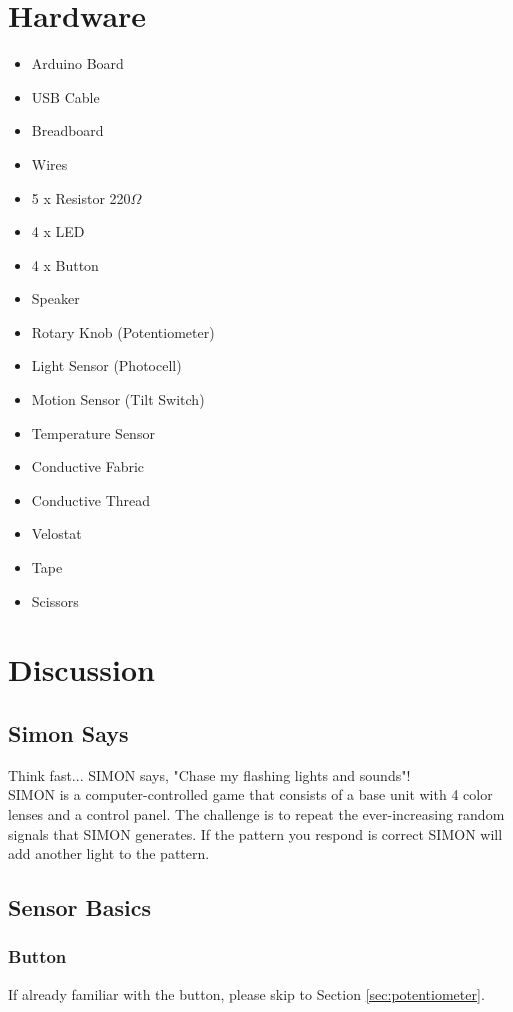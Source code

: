 \documentclass[12pt,letterpaper,oneside]{article}
\begin{document}
\section{Hardware}
		\begin{itemize} \parskip0pt
			\item Arduino Board
			\item USB Cable
			\item Breadboard
			\item Wires
			\item 5 x Resistor 220$\Omega$
			\item 4 x LED
			\item 4 x Button
			\item Speaker
			\item Rotary Knob (Potentiometer)
			\item Light Sensor (Photocell)
			\item Motion Sensor (Tilt Switch)
			\item Temperature Sensor
			\item Conductive Fabric
			\item Conductive Thread
			\item Velostat
			\item Tape
			\item Scissors
		\end{itemize}

\section{Discussion}

	\subsection{Simon Says} \label{sec:simon}
Think fast... SIMON says, "Chase my flashing lights and sounds"!\bigskip
\\SIMON is a computer-controlled game that consists of a base unit with 4 color lenses and a control panel. The challenge is to repeat the ever-increasing random signals that SIMON generates. If the pattern you respond is correct SIMON will add another light to the pattern.

	\subsection{Sensor Basics}	
			\subsubsection{Button}
			If already familiar with the button, please skip to Section \ref{sec:potentiometer}. 
\end{document}
